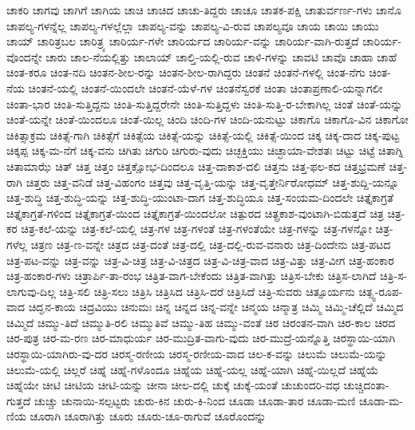 {ಚಾಕರಿ
ಚಾಗವು
ಚಾಗಿಗೆ
ಚಾಗಿಯ
ಚಾಚಿ
ಚಾಚಿದ
ಚಾಚು-ತಿದ್ದರು
ಚಾಚೂ
ಚಾತಕ-ಪಕ್ಷಿ
ಚಾತುರ್ವರ್ಣ-ಗಳು
ಚಾನೊ
ಚಾಪಲ್ಯ-ಗಳನ್ನೆಲ್ಲ
ಚಾಪಲ್ಯ-ಗಳಲ್ಲೆಲ್ಲಾ
ಚಾಪಲ್ಯ-ವನ್ನು
ಚಾಪಲ್ಯ-ವಿ-ರುವ
ಚಾಪಲ್ಯವೂ
ಚಾಯ
ಚಾಯಿ
ಚಾಯು
ಚಾಯ್
ಚಾರಿತ್ರಬಲ
ಚಾರಿತ್ರ್ಯ
ಚಾರಿರ್ಯ-ಗಳೇ
ಚಾರಿರ್ಯದ
ಚಾರಿರ್ಯ-ವನ್ನು
ಚಾರಿರ್ಯ-ವಾಗಿ-ರುತ್ತದೆ
ಚಾರಿರ್ಯ-ವೊಂದನ್ನೇ
ಚಾರು
ಚಾಲ-ನೆಯಲ್ಲಿತ್ತು
ಚಾಲಾಯ್
ಚಾಲ್ತಿ-ಯಲ್ಲಿ-ರುವ
ಚಾಳಿ-ಗಳನ್ನು
ಚಾವಟಿ
ಚಾವೊ
ಚಾಹಾ
ಚಾಹೆ
ಚಿಂತ-ಕರೂ
ಚಿಂತ-ನದಿ
ಚಿಂತನ-ಶೀಲ-ರನ್ನು
ಚಿಂತನ-ಶೀಲ-ರಾಗಿದ್ದರು
ಚಿಂತನೆ
ಚಿಂತನೆ-ಗಳಲ್ಲಿ
ಚಿಂತ-ನೆಗು
ಚಿಂತ-ನೆಯ
ಚಿಂತನೆ-ಯಲ್ಲಿ
ಚಿಂತನೆ-ಯಿಂದಲೇ
ಚಿಂತನೆ-ಯೆಳೆ-ಗಳ
ಚಿಂತನೆಸ್ವರಕೆ
ಚಿಂತಾ
ಚಿಂತಾಪ್ರಣಾಲಿ-ಯನ್ನಾಗಲೀ
ಚಿಂತಾ-ಭಾರ
ಚಿಂತಿ-ಸುತ್ತಿದ್ದನು
ಚಿಂತಿ-ಸುತ್ತಿದ್ದರೇನೇ
ಚಿಂತಿ-ಸುತ್ತಿದ್ದಳು
ಚಿಂತಿ-ಸುತ್ತಿ-ರ-ಬೇಕಾಗಿಲ್ಲ
ಚಿಂತೆ
ಚಿಂತೆ-ಯನ್ನು
ಚಿಂತೆ-ಯನ್ನೇ
ಚಿಂತೆ-ಯಿಂದಲೂ
ಚಿಂತೆ-ಯಿಲ್ಲ
ಚಿಂದಿ
ಚಿಂದಿ-ಗಳ
ಚಿಂದಿ-ಯನುಟ್ಟು
ಚಿಕಾಗೊ
ಚಿಕಾಗೊ-ವಿನ
ಚಿಕಾಗೋ
ಚಿಕಿತ್ಸಾಕ್ರಮ
ಚಿಕಿತ್ಸೆ-ಗಾಗಿ
ಚಿಕಿತ್ಸೆಗೆ
ಚಿಕಿತ್ಸೆಯ
ಚಿಕಿತ್ಸೆ-ಯನ್ನು
ಚಿಕಿತ್ಸೆ-ಯಲ್ಲಿ
ಚಿಕಿತ್ಸೆ-ಯಿಂದ
ಚಿಕ್ಕ
ಚಿಕ್ಕ-ದಾದ
ಚಿಕ್ಕ-ಪುಟ್ಟ
ಚಿಕ್ಕಪ್ಪ
ಚಿಕ್ಕ-ಮ-ನೆಗೆ
ಚಿಕ್ಕ-ವನು
ಚಿಗಿತು
ಚಿಗುರಿ
ಚಿಗುರು-ವುದು
ಚಿಚ್ಛಕ್ತಿಯು
ಚಿಚ್ಛಾಯಾ-ವೇಶತಃ
ಚಿಟ್ಟು
ಚಿಟ್ಟೆ
ಚಿತಾಗ್ನಿ
ಚಿತಾಮಾಝೆ
ಚಿತ್
ಚಿತ್ತ
ಚಿತ್ತಂ
ಚಿತ್ತಕ್ಷೋಭ-ದಿಂದಲೂ
ಚಿತ್ತ-ದಾಕಾಶ-ದಲಿ
ಚಿತ್ತನು
ಚಿತ್ತ-ಫಲ-ಕದ
ಚಿತ್ತಭ್ರಮಣೆ
ಚಿತ್ತ-ರಾಗಿ
ಚಿತ್ತರು
ಚಿತ್ತ-ವನಿಡೆ
ಚಿತ್ತ-ವಿಹಂಗಂ
ಚಿತ್ತವು
ಚಿತ್ತ-ವೃತ್ತಿ-ಯನ್ನು
ಚಿತ್ತ-ವೃತ್ತೇರ್ನಿರೋಧಮ್
ಚಿತ್ತ-ಶುದ್ದಿ-ಯನ್ನೂ
ಚಿತ್ತ-ಶುದ್ಧಿ
ಚಿತ್ತ-ಶುದ್ಧಿ-ಯನ್ನು
ಚಿತ್ತ-ಶುದ್ಧಿ-ಯುಂಟಾ-ದಾಗ
ಚಿತ್ತ-ಶುದ್ಧಿಯೂ
ಚಿತ್ತ-ಸಂಯಮ-ದಿಂದಲೇ
ಚಿತ್ತೈಕಾಗ್ರತೆ
ಚಿತ್ತೈಕಾಗ್ರತೆ-ಗಳಿಂದ
ಚಿತ್ತೈಕಾಗ್ರತೆ-ಯಿಂದ
ಚಿತ್ತೈಕಾಗ್ರತೆ-ಯಿಂದಲೋ
ಚಿತ್ಪುರದ
ಚಿತ್ಪ್ರಕಾಶ-ವುಂಟಾಗಿ-ಬಿಡುತ್ತದೆ
ಚಿತ್ರ
ಚಿತ್ರ-ಕರ
ಚಿತ್ರ-ಕಲೆ-ಯನ್ನು
ಚಿತ್ರ-ಕಲೆ-ಯಲ್ಲಿ
ಚಿತ್ರ-ಗಳ
ಚಿತ್ರ-ಗಳಂತೆ
ಚಿತ್ರ-ಗಳಂತೆಯೇ
ಚಿತ್ರ-ಗಳನ್ನು
ಚಿತ್ರ-ಗಳನ್ನೋ
ಚಿತ್ರ-ಗಳೆಲ್ಲ
ಚಿತ್ರಣ
ಚಿತ್ರ-ಣ-ವನ್ನೇ
ಚಿತ್ರದ
ಚಿತ್ರ-ದಂತೆ
ಚಿತ್ರ-ದಲ್ಲಿ
ಚಿತ್ರ-ದಲ್ಲಿ-ರುವ-ವನಾರು
ಚಿತ್ರ-ದಿಂದೇನು
ಚಿತ್ರ-ಪಟದ
ಚಿತ್ರ-ಪಟ-ವನ್ನು
ಚಿತ್ರ-ವನ್ನು
ಚಿತ್ರ-ವಿ-ಚಿತ್ರ
ಚಿತ್ರ-ವಿ-ಚಿತ್ರದ
ಚಿತ್ರ-ವಿ-ಚಿತ್ರ-ವಾದ
ಚಿತ್ರ-ವಿತ್ತು
ಚಿತ್ರ-ವೀಗ
ಚಿತ್ರ-ಹಂಕಾರ
ಚಿತ್ರ-ಹಂಕಾರ-ಗಳು
ಚಿತ್ರಾರ್ಪಿ-ತಾ-ರಂಭ
ಚಿತ್ರಿತ-ವಾಗ-ಬೇಕೆಂದು
ಚಿತ್ರಿತ-ವಾಗಿತ್ತು
ಚಿತ್ರಿಸ-ಬೇಕು
ಚಿತ್ರಿಸ-ಲಾಗಿದೆ
ಚಿತ್ರಿ-ಸ-ಲಾಗುವು-ದಿಲ್ಲ
ಚಿತ್ರಿ-ಸಲಿ
ಚಿತ್ರಿ-ಸಲು
ಚಿತ್ರಿಸಿ
ಚಿತ್ರಿಸಿದ
ಚಿತ್ರಿಸಿ-ದರೆ
ಚಿತ್ರಿಸಿದೆ
ಚಿತ್ರಿ-ಸುವರು
ಚಿತ್ಸೂರ್ಯನು
ಚಿತ್ಸ್ವ-ರೂಪ-ವಾದ
ಚಿದ್ಘನ-ಕಾಯ
ಚಿದ್ರವಿಯು
ಚಿನುಮಃ
ಚಿನ್ನ
ಚಿನ್ನದ
ಚಿನ್ನ-ವನ್ನೇ
ಚಿನ್ಮಯ
ಚಿನ್ಮಾತ್ರ
ಚಿಮ್ಮಿ
ಚಿಮ್ಮಿ-ಚೆಲ್ಲಿದೆ
ಚಿಮ್ಮಿದ
ಚಿಮ್ಮಿದೆ
ಚಿಮ್ಮು-ತಿದೆ
ಚಿಮ್ಮುತಿ-ರಲಿ
ಚಿಮ್ಮುತಿವೆ
ಚಿಮ್ಮು-ತಿಹ
ಚಿಮ್ಮು-ವಂತೆ
ಚಿರ
ಚಿರಂತನ-ವಾಗಿ
ಚಿರ-ಕಾಲ
ಚಿರದ
ಚಿರ-ಪುತ್ರ
ಚಿರ-ಮ-ರಣ
ಚಿರ-ಮಾಧುರ್ಯ
ಚಿರ-ಮುದ್ರಿತ-ವಾಗು-ವುದು
ಚಿರ-ಮುದ್ರೆ-ಯನ್ನೊತ್ತಿ
ಚಿರಸ್ಥಾಯಿ-ಯಾಗಿ
ಚಿರಸ್ಥಾಯಿ-ಯಾಗಿರು-ವು-ದರ
ಚಿರಸ್ಮ-ರಣೀಯ
ಚಿರಸ್ಮ-ರಣೀಯ-ವಾದ
ಚಿಲ-ಕ-ವನ್ನು
ಚಿಲುಮೆ
ಚಿಲುಮೆ-ಯನ್ನು
ಚಿಲುಮೆ-ಯಲ್ಲಿ
ಚಿಲ್ಲರೆ
ಚಿಹ್ನೆ
ಚಿಹ್ನೆ-ಗಳೊಂದೂ
ಚಿಹ್ನೆಯ
ಚಿಹ್ನೆ-ಯಲ್ಲ
ಚಿಹ್ನೆ-ಯಾಗಿ
ಚಿಹ್ನೆ-ಯಿಲ್ಲದೆ
ಚಿಹ್ನೆಯೆ
ಚಿಹ್ನೆಯೇ
ಚೀಟಿ
ಚೀಟಿಯ
ಚೀಟಿ-ಯನ್ನು
ಚೀನಾ
ಚೀಲ-ದಲ್ಲಿ
ಚುಕ್ಕೆ
ಚುಕ್ಕೆ-ಯಂತೆ
ಚುಚುಂದರಿ-ವಧ
ಚುಚ್ಚಿದಂತಾ-ಗುತ್ತದೆ
ಚುಚ್ಚು
ಚುನಾಯಿ-ಸಲ್ಪಟ್ಟರು
ಚುರು-ಕಿನ
ಚುರು-ಕಿ-ನಿಂದ
ಚೂಡಾ
ಚೂಡಾ-ತಾರ
ಚೂಡಾ-ಮಣಿ
ಚೂಡಾ-ಮ-ಣಿಯ
ಚೂರಾಗಿ
ಚೂರಾಗಿತ್ತು
ಚೂರು
ಚೂರು-ಚೂ-ರಾಗುವೆ
ಚೂರೊಂದನ್ನು
}
